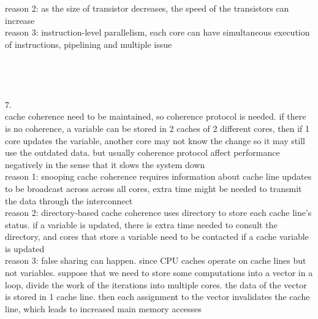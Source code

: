 \documentclass[12pt,border=4pt,multi]{article}%
\begin{document}
reason 2: as the size of transistor decreases, the speed of the transistors can increase\\
reason 3: instruction-level parallelism, each core can have simultaneous execution of instructions, pipelining and multiple issue\\
\\
\\
\\
\\
7.\\
cache coherence need to be maintained, so coherence protocol is needed. if there is no coherence, a variable can be stored in 2 caches of 2 different cores, then if 1 core updates the variable, another core may not know the change so it may still use the outdated data. but usually coherence protocol affect performance negatively in the sense that it slows the system down\\
reason 1: snooping cache coherence requires information about cache line updates to be broadcast across across all cores, extra time might be needed to transmit the data through the interconnect\\
reason 2: directory-based cache coherence uses directory to store each cache line's status. if a variable is updated, there is extra time needed to consult the directory, and cores that store a variable need to be contacted if a cache variable is updated\\ 
reason 3: false sharing can happen. since CPU caches operate on cache lines but not variables. suppose that we need to store some computations into a vector in a loop, divide the work of the iterations into multiple cores. the data of the vector is stored in 1 cache line. then each assignment to the vector invalidates the cache line, which leads to increased main memory accesses\\ 
\end{document}
